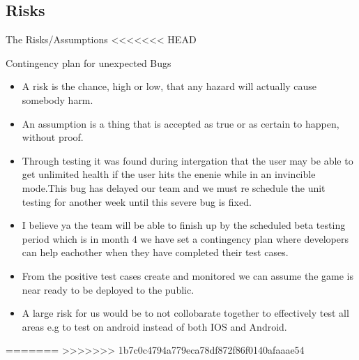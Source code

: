 
\subsection{Risks}
The Risks/Assumptions
<<<<<<< HEAD



\centerline{Contingency plan for unexpected Bugs}



\begin{itemize}

	\item A risk is the chance, high or low, that any hazard will actually cause somebody harm. 


	\item An assumption is a thing that is accepted as true or as certain to happen, without proof.


  \item Through testing it was found during intergation that the user may be able to get unlimited health if the user hits the enenie while in an invincible mode.This bug has delayed our team and we must re schedule the unit testing for another week until this severe bug is fixed.

  \item I believe ya the team will be able to finish up by the scheduled beta testing period which is in month 4 we have set a contingency plan where developers can help eachother when they have completed their test cases.



  \item From the positive test cases create and monitored we can assume the game is near ready to be deployed to the public. 

  \item A large risk for us would be to not collobarate together to effectively test all areas e.g to test on android instead of both IOS and Android.

\end{itemize}
=======
>>>>>>> 1b7c0c4794a779eca78df872f86f0140afaaae54
